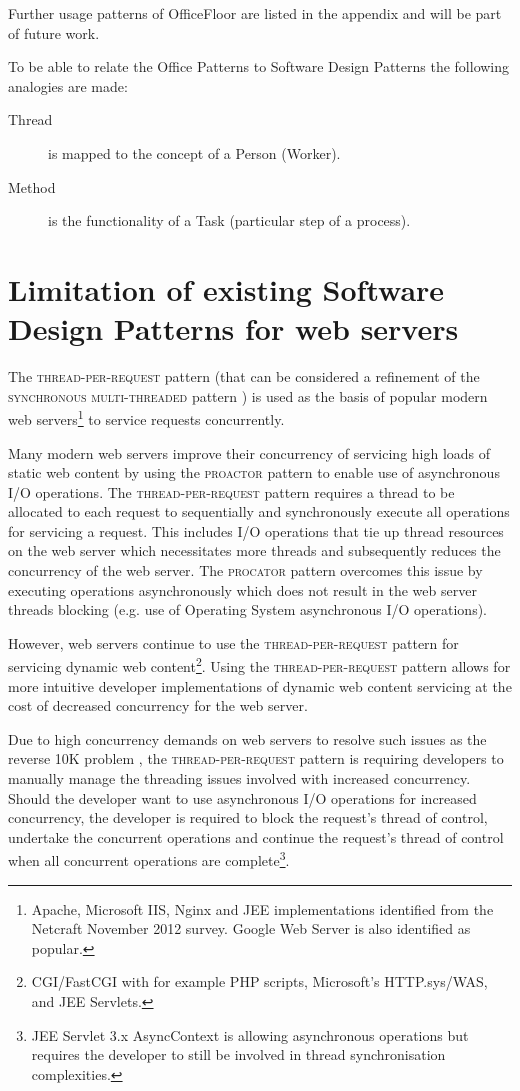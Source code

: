 \documentclass[prodmode]{style/acmlarge}
\begin{document}
Further usage patterns of OfficeFloor are listed in the appendix and will be part of future work.

To be able to relate the Office Patterns to Software Design Patterns the following analogies are made:
\begin{description}
  \item[Thread] is mapped to the concept of a Person (Worker).
  \item[Method] is the functionality of a Task (particular step of a process).
\end{description}


\section{Limitation of existing Software Design Patterns for web servers}

The \textsc{thread-per-request} pattern \cite{thread-per-request} (that can be
considered a refinement of the \textsc{synchronous multi-threaded} pattern
\cite{proactor}) is used as the basis of popular modern web
servers\footnote{Apache, Microsoft IIS, Nginx and JEE implementations identified
from the Netcraft November 2012 survey.  Google Web Server is also identified as
popular.} to service requests concurrently.

Many modern web servers improve their concurrency of servicing high loads of
static web content by using the \textsc{proactor} pattern \cite{proactor} to
enable use of asynchronous I/O operations.  The \textsc{thread-per-request}
pattern requires a thread to be allocated to each request to sequentially and
synchronously execute all operations for servicing a request.  This includes I/O
operations that tie up thread resources on the web server which necessitates
more threads and subsequently reduces the concurrency of the web server.  The
\textsc{procator} pattern overcomes this issue by executing operations
asynchronously which does not result in the web server threads blocking (e.g.
use of Operating System asynchronous I/O operations).

However, web servers continue to use the \textsc{thread-per-request} pattern for
servicing dynamic web content\footnote{CGI/FastCGI with for example PHP scripts,
Microsoft's HTTP.sys/WAS, and JEE Servlets.}.  Using the
\textsc{thread-per-request} pattern allows for more intuitive developer
implementations of dynamic web content servicing at the cost of decreased
concurrency for the web server.

Due to high concurrency demands on web servers to resolve such issues as the
reverse 10K problem \cite{reverse-ten-k-problem}, the
\textsc{thread-per-request} pattern is requiring developers to manually manage
the threading issues involved with increased concurrency.  Should the developer
want to use asynchronous I/O operations for increased concurrency, the developer
is required to block the request's thread of control, undertake the concurrent
operations and continue the request's thread of control when all concurrent
operations are complete\footnote{JEE Servlet 3.x AsyncContext is allowing
asynchronous operations but requires the developer to still be involved in
thread synchronisation complexities.}.
\end{document}
